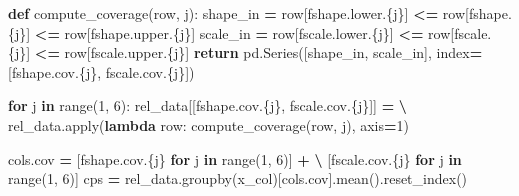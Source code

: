 \documentclass[
]{article}
\newenvironment{Shaded}{\begin{snugshade}}{\end{snugshade}}
\newcommand{\BuiltInTok}[1]{#1}
\newcommand{\ControlFlowTok}[1]{\textcolor[rgb]{0.13,0.29,0.53}{\textbf{#1}}}
\newcommand{\DecValTok}[1]{\textcolor[rgb]{0.00,0.00,0.81}{#1}}
\newcommand{\KeywordTok}[1]{\textcolor[rgb]{0.13,0.29,0.53}{\textbf{#1}}}
\newcommand{\NormalTok}[1]{#1}
\newcommand{\OperatorTok}[1]{\textcolor[rgb]{0.81,0.36,0.00}{\textbf{#1}}}
\newcommand{\SpecialCharTok}[1]{\textcolor[rgb]{0.00,0.00,0.00}{#1}}
\newcommand{\SpecialStringTok}[1]{\textcolor[rgb]{0.31,0.60,0.02}{#1}}
\theoremstyle{definition}
\theoremstyle{plain}
\theoremstyle{definition}
\theoremstyle{definition}
\theoremstyle{definition}
\theoremstyle{definition}
\theoremstyle{remark}
\begin{document}
\begin{Shaded}
\begin{Highlighting}[]
  \KeywordTok{def}\NormalTok{ compute\_coverage(row, j):}
\NormalTok{    shape\_in }\OperatorTok{=}\NormalTok{ row[}\SpecialStringTok{f\textquotesingle{}shape.lower.}\SpecialCharTok{\{j\}}\SpecialStringTok{\textquotesingle{}}\NormalTok{] }\OperatorTok{\textless{}=}\NormalTok{ row[}\SpecialStringTok{f\textquotesingle{}shape.}\SpecialCharTok{\{j\}}\SpecialStringTok{\textquotesingle{}}\NormalTok{] }\OperatorTok{\textless{}=}\NormalTok{ row[}\SpecialStringTok{f\textquotesingle{}shape.upper.}\SpecialCharTok{\{j\}}\SpecialStringTok{\textquotesingle{}}\NormalTok{]}
\NormalTok{    scale\_in }\OperatorTok{=}\NormalTok{ row[}\SpecialStringTok{f\textquotesingle{}scale.lower.}\SpecialCharTok{\{j\}}\SpecialStringTok{\textquotesingle{}}\NormalTok{] }\OperatorTok{\textless{}=}\NormalTok{ row[}\SpecialStringTok{f\textquotesingle{}scale.}\SpecialCharTok{\{j\}}\SpecialStringTok{\textquotesingle{}}\NormalTok{] }\OperatorTok{\textless{}=}\NormalTok{ row[}\SpecialStringTok{f\textquotesingle{}scale.upper.}\SpecialCharTok{\{j\}}\SpecialStringTok{\textquotesingle{}}\NormalTok{]}
    \ControlFlowTok{return}\NormalTok{ pd.Series([shape\_in, scale\_in], index}\OperatorTok{=}\NormalTok{[}\SpecialStringTok{f\textquotesingle{}shape.cov.}\SpecialCharTok{\{j\}}\SpecialStringTok{\textquotesingle{}}\NormalTok{, }\SpecialStringTok{f\textquotesingle{}scale.cov.}\SpecialCharTok{\{j\}}\SpecialStringTok{\textquotesingle{}}\NormalTok{])}

  \ControlFlowTok{for}\NormalTok{ j }\KeywordTok{in} \BuiltInTok{range}\NormalTok{(}\DecValTok{1}\NormalTok{, }\DecValTok{6}\NormalTok{):}
\NormalTok{    rel\_data[[}\SpecialStringTok{f\textquotesingle{}shape.cov.}\SpecialCharTok{\{j\}}\SpecialStringTok{\textquotesingle{}}\NormalTok{, }\SpecialStringTok{f\textquotesingle{}scale.cov.}\SpecialCharTok{\{j\}}\SpecialStringTok{\textquotesingle{}}\NormalTok{]] }\OperatorTok{=} \OperatorTok{\textbackslash{}}
\NormalTok{      rel\_data.}\BuiltInTok{apply}\NormalTok{(}\KeywordTok{lambda}\NormalTok{ row: compute\_coverage(row, j), axis}\OperatorTok{=}\DecValTok{1}\NormalTok{)}

\NormalTok{  cols.cov }\OperatorTok{=}\NormalTok{ [}\SpecialStringTok{f\textquotesingle{}shape.cov.}\SpecialCharTok{\{j\}}\SpecialStringTok{\textquotesingle{}} \ControlFlowTok{for}\NormalTok{ j }\KeywordTok{in} \BuiltInTok{range}\NormalTok{(}\DecValTok{1}\NormalTok{, }\DecValTok{6}\NormalTok{)] }\OperatorTok{+} \OperatorTok{\textbackslash{}}
\NormalTok{             [}\SpecialStringTok{f\textquotesingle{}scale.cov.}\SpecialCharTok{\{j\}}\SpecialStringTok{\textquotesingle{}} \ControlFlowTok{for}\NormalTok{ j }\KeywordTok{in} \BuiltInTok{range}\NormalTok{(}\DecValTok{1}\NormalTok{, }\DecValTok{6}\NormalTok{)]}
\NormalTok{  cps }\OperatorTok{=}\NormalTok{ rel\_data.groupby(x\_col)[cols.cov].mean().reset\_index()}


\end{Highlighting}
\end{Shaded}
\end{document}
